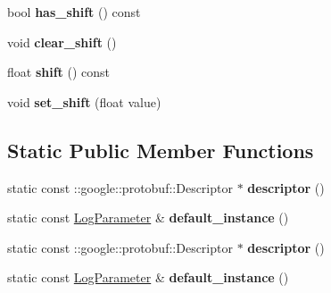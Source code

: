 \begin{DoxyCompactItemize}
bool {\bfseries has\+\_\+shift} () const
\item 
\mbox{\label{classcaffe_1_1_log_parameter_aeb2aae1873248ced2b445d2a3c0d6d25}} 
void {\bfseries clear\+\_\+shift} ()
\item 
\mbox{\label{classcaffe_1_1_log_parameter_a746572e8045df27ea06c4d3df09607ba}} 
float {\bfseries shift} () const
\item 
\mbox{\label{classcaffe_1_1_log_parameter_abcabe37e5c92a7e87530a4205f5e2d25}} 
void {\bfseries set\+\_\+shift} (float value)
\end{DoxyCompactItemize}
\subsection*{Static Public Member Functions}
\begin{DoxyCompactItemize}
\item 
\mbox{\label{classcaffe_1_1_log_parameter_a0a276edbeee131c05a5f7d2419b701a1}} 
static const \+::google\+::protobuf\+::\+Descriptor $\ast$ {\bfseries descriptor} ()
\item 
\mbox{\label{classcaffe_1_1_log_parameter_a3653fd8c3ce8ef6dfb87bc7262d5fb1b}} 
static const \mbox{\hyperlink{classcaffe_1_1_log_parameter}{Log\+Parameter}} \& {\bfseries default\+\_\+instance} ()
\item 
\mbox{\label{classcaffe_1_1_log_parameter_aa84aedd36b2373197a3a92aec57eb513}} 
static const \+::google\+::protobuf\+::\+Descriptor $\ast$ {\bfseries descriptor} ()
\item 
\mbox{\label{classcaffe_1_1_log_parameter_a4a12229023d262e274314c025049e42c}} 
static const \mbox{\hyperlink{classcaffe_1_1_log_parameter}{Log\+Parameter}} \& {\bfseries default\+\_\+instance} ()
\end{DoxyCompactItemize}
